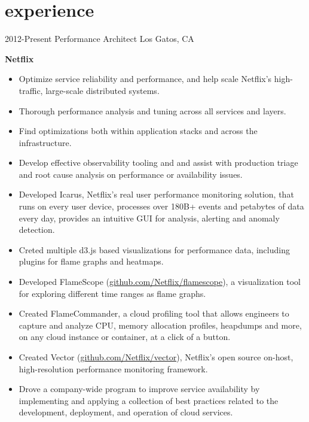 \section{experience}

\begin{entrylist}
  \entry
    {2012-Present}
    {Performance Architect}
    {Los Gatos, CA}
    {
      \textbf{Netflix}
      \begin{itemize}
        \item Optimize service reliability and performance, and help scale Netflix's high-traffic, large-scale distributed systems.
        \item Thorough performance analysis and tuning across all services and layers.
        \item Find optimizations both within application stacks and across the infrastructure.
        \item Develop effective observability tooling and and assist with production triage and root cause analysis on performance or availability issues.  
      \end{itemize}
      \begin{itemize}
        \item Developed Icarus, Netflix's real user performance monitoring solution, that runs on every user device, processes over 180B+ events and petabytes of data every day, provides an intuitive GUI for analysis, alerting and anomaly detection.
        \item Creted multiple d3.js based visualizations for performance data, including plugins for flame graphs and heatmaps.
        \item Developed FlameScope (\href{https://github.com/Netflix/flamescope}{github.com/Netflix/flamescope}), a visualization tool for exploring different time ranges as flame graphs.
        \item Created FlameCommander, a cloud profiling tool that allows engineers to capture and analyze CPU, memory allocation profiles, heapdumps and more, on any cloud instance or container, at a click of a button.
        \item Created Vector (\href{https://github.com/Netflix/vector}{github.com/Netflix/vector}), Netflix's open source on-host, high-resolution performance monitoring framework.
        \item Drove a company-wide program to improve service availability by implementing and applying a collection of best practices related to the development, deployment, and operation of cloud services.

\end{itemize}}
\end{entrylist}

